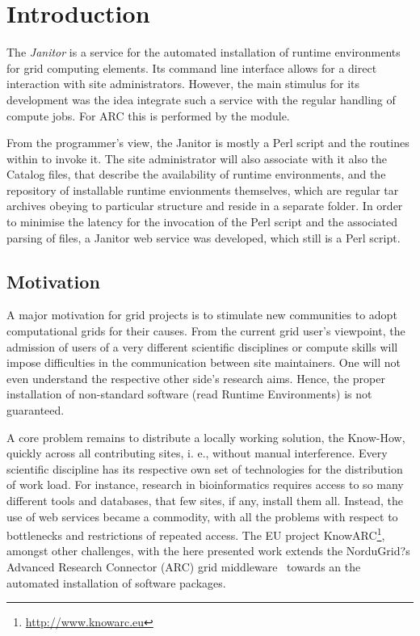 \chapter{Introduction}

The {\em Janitor} is a service for the automated installation of runtime environments for grid computing elements.
Its command line interface allows for a direct interaction with site administrators. However, the main stimulus
for its development was the idea integrate such a service with the regular handling of compute jobs. For ARC this
is performed by the \AREX module.

From the programmer's view, the Janitor is mostly a Perl script and the routines within \AREX to invoke it. The
site administrator will also associate with it also the Catalog files, that describe the availability of runtime
environments, and the repository of installable runtime envionments themselves, which are regular tar archives obeying
to particular structure and reside in a separate folder. In order to minimise the latency for the invocation of
the Perl script and the associated parsing of files, a Janitor web service was developed, which still is a Perl
script.

\section{Motivation}

A major motivation for grid projects is to stimulate new communities to adopt computational grids for their
causes. From the current grid user's viewpoint, the admission of users of a very different scientific disciplines
or compute skills will impose difficulties in the communication between site maintainers. One will not even understand
the respective other side's research aims. Hence, the proper installation of non-standard software (read Runtime
Environments) is not guaranteed.

A core problem remains to distribute a locally working solution, the Know-How, quickly across all contributing
sites, i. e., without manual interference. Every scientific discipline has its respective own set of
technologies for the distribution of work load. For instance, research in bioinformatics requires access to so many
different tools and databases, that few sites, if any, install them all. Instead, the use of web services became
a commodity, with all the problems with respect to bottlenecks and restrictions of repeated access.
The EU project KnowARC\footnote{\href{http://www.knowarc.eu}{http://www.knowarc.eu}},  amongst other challenges,
with the here presented work extends the NorduGrid?s
Advanced Research Connector (ARC) grid middleware~\cite{ELLERT_2007} towards an the
automated installation of software packages.

